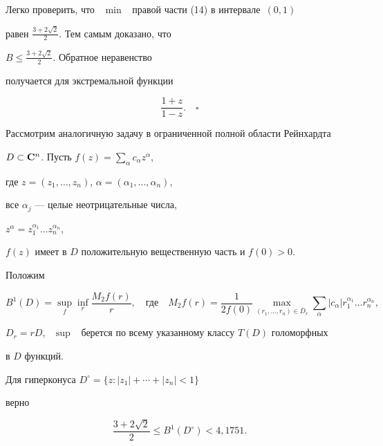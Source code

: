 Легко проверить, что \ $\min$ \ правой части (14) в интервале~$(0,1)$


равен $\frac{3+2\sqrt{2}}{2}$. Тем самым доказано, что


$B\leq\frac{3+2\sqrt{2}}{2}$. Обратное неравенство


получается для экстремальной функции


\begin{equation}


\frac{1+z}{1-z}.\quad\square


\end{equation}





Рассмотрим аналогичную задачу в ограниченной полной области Рейнхардта


$D\subset{\bf C}^n$. Пусть $f(z)=\sum\limits_{\alpha}c_{\alpha}z^{\alpha}$,


где $z=(z_1,\dotsc,z_n)$, ${\alpha}=({\alpha}_1,\dotsc,{\alpha}_n)$,


все ${\alpha}_j$ --- целые неотрицательные числа,


$z^{\alpha}=z_1^{{\alpha}_1}\dotsc z_n^{{\alpha}_n}$,


$f(z)$ имеет в $D$ положительную вещественную часть и $f(0)>0$.


Положим


$$


B^1(D)=\sup\limits_f\inf\limits_r\frac{M_2f(r)}{r}, \quad


\text{где}\quad


M_2f(r)=\frac{1}{2f(0)}\max_{(r_1,\dotsc,r_n)\in{\overline D}_r}


\sum_{\alpha}|c_{\alpha}|r_1^{{\alpha}_1}\dotsc r_n^{{\alpha}_n},


$$


$D_r=rD$, \ $\sup$ \ берется по всему указанному классу $T(D)$ голоморфных


в $D$ функций.





\begin{thm}


Для гиперконуса $D^\circ=\{z:|z_1|+\dotsb+|z_n|<1\}$


верно 


\begin{equation}


\frac{3+2\sqrt{2}}{2}\leq B^1(D^\circ)<4,1751. %


\end{equation}


\end{thm}





